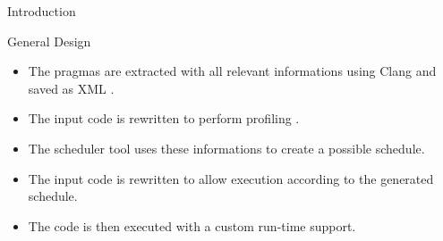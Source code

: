 \documentclass[xcolor=dvipsnames]{beamer}
\begin{document}
\begin{section}{Introduction}
\begin{frame}{\hskip 0.3cm General Design}
\begin{itemize}

\item The pragmas are extracted with all relevant informations using Clang and saved as XML .

\item The input code is rewritten to perform profiling .

\item The scheduler tool uses these informations to create a possible schedule.

\item The input code is rewritten to allow execution according to the generated schedule.

\item The code is then executed with a custom run-time support.

\end{itemize}

\end{frame}











\begin{frame}{\hskip 0.3cm }



\end{frame}
\end{section}
\end{document}
